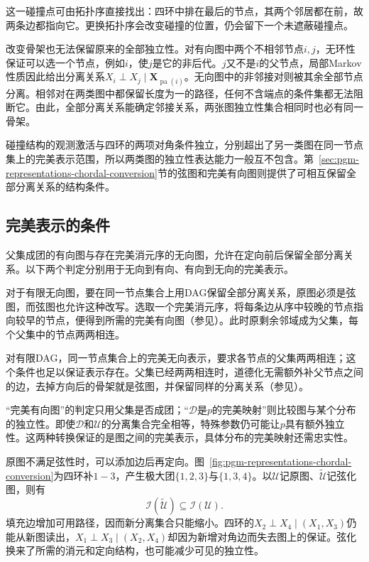 这一碰撞点可由拓扑序直接找出：四环中排在最后的节点，其两个邻居都在前，故两条边都指向它。更换拓扑序会改变碰撞的位置，仍会留下一个未遮蔽碰撞点。

改变骨架也无法保留原来的全部独立性。对有向图中两个不相邻节点$i,j$，无环性保证可以选一个节点，例如$i$，使$j$是它的非后代。$j$又不是$i$的父节点，局部Markov性质因此给出分离关系$X_i\perp X_j\mid\bm{X}_{\operatorname{pa}(i)}$。无向图中的非邻接对则被其余全部节点分离。相邻对在两类图中都保留长度为一的路径，任何不含端点的条件集都无法阻断它。由此，全部分离关系能确定邻接关系，两张图独立性集合相同时也必有同一骨架。

碰撞结构的观测激活与四环的两项对角条件独立，分别超出了另一类图在同一节点集上的完美表示范围，所以两类图的独立性表达能力一般互不包含。第~\ref{sec:pgm-representations-chordal-conversion}节的弦图和完美有向图则提供了可相互保留全部分离关系的结构条件。

\subsection{完美表示的条件}
\label{sec:pgm-representations-perfect-dags}

父集成团的有向图与存在完美消元序的无向图，允许在定向前后保留全部分离关系。以下两个判定分别用于无向到有向、有向到无向的完美表示。

对于有限无向图，要在同一节点集合上用DAG保留全部分离关系，原图必须是弦图，而弦图也允许这种改写。选取一个完美消元序，将每条边从序中较晚的节点指向较早的节点，便得到所需的完美有向图（参见）。此时原剩余邻域成为父集，每个父集中的节点两两相连。


对有限DAG，同一节点集合上的完美无向表示，要求各节点的父集两两相连；这个条件也足以保证表示存在。父集已经两两相连时，道德化无需额外补父节点之间的边，去掉方向后的骨架就是弦图，并保留同样的分离关系（参见）。

“完美有向图”的判定只用父集是否成团；“$\mathcal{D}$是$p$的完美映射”则比较图与某个分布的独立性。即使$\mathcal{D}$和$\mathcal{U}$的分离集合完全相等，特殊参数仍可能让$p$具有额外独立性。这两种转换保证的是图之间的完美表示，具体分布的完美映射还需忠实性。

原图不满足弦性时，可以添加边后再定向。图~\ref{fig:pgm-representations-chordal-conversion}为四环补$1-3$，产生极大团$\{1,2,3\}$与$\{1,3,4\}$。以$\mathcal{U}$记原图、$\widetilde{\mathcal{U}}$记弦化图，则有
\[
  \mathcal{I}(\widetilde{\mathcal{U}})
  \subseteq \mathcal{I}(\mathcal{U}).
\]
填充边增加可用路径，因而新分离集合只能缩小。四环的$X_2\perp X_4\mid(X_1,X_3)$仍能从新图读出，$X_1\perp X_3\mid(X_2,X_4)$却因为新增对角边而失去图上的保证。弦化换来了所需的消元和定向结构，也可能减少可见的独立性。

